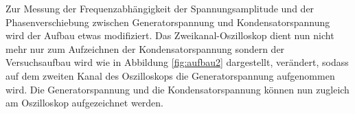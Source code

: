Zur Messung der Frequenzabhängigkeit der Spannungsamplitude und der Phasenverschiebung zwischen Generatorspannung und Kondensatorspannung wird der Aufbau etwas modifiziert.
Das Zweikanal-Oszilloskop dient nun nicht mehr nur zum Aufzeichnen der Kondensatorspannung sondern der Versuchsaufbau wird wie in Abbildung \eqref{fig:aufbau2} dargestellt, verändert, sodass auf dem zweiten Kanal des Oszilloskops die Generatorspannung aufgenommen wird. Die Generatorspannung und die Kondensatorspannung können nun zugleich am Oszilloskop aufgezeichnet werden.
